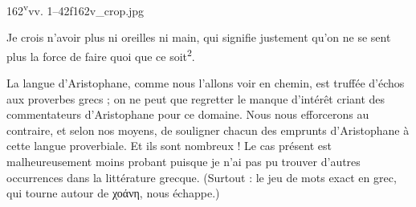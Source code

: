 \documentclass{thesmo}
\begin{document}
\begin{folio}{162\textsuperscript{v}}{vv. 1–42}{f162v_crop.jpg}
\begin{texte}
{{Je crois n'avoir plus ni oreilles ni main,} qui signifie justement qu'on ne se sent plus la force de faire quoi que ce soit\textsuperscript{2}.\par 



La langue d'Aristophane, comme nous l'allons voir en chemin, est truffée d'échos aux proverbes grecs ; on ne peut que regretter le manque d'intérêt criant des commentateurs d'Aristophane pour ce domaine. Nous nous efforcerons au contraire, et selon nos moyens, de souligner chacun des emprunts d'Aristophane à cette langue proverbiale. Et ils sont nombreux ! Le cas présent est malheureusement moins probant puisque je n'ai pas pu trouver d'autres occurrences dans la littérature grecque. (Surtout : le jeu de mots exact en grec, qui tourne autour de χοάνη, nous échappe.)





}
\end{texte}
\end{folio}
\end{document}
